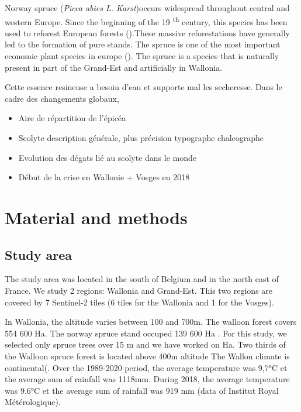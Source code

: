 \documentclass[3p,times]{elsarticle}
\begin{document}
Norway spruce (\textit{Picea abies L. Karst})occurs widespread throughout central and western Europe. Since the beginning of the 19 \textsuperscript{th} century, this species has been used to reforest European forests (\citep{3PresentDistributionofSecondaryNorwaySpruceinEurope}).These massive reforestations have generally led to the formation of pure stands. The spruce is one of the most important economic plant species in europe (\citep{nystedt_norway_2013}).
The spruce is a species that is naturally present in part of the Grand-Est  and artificially  in Wallonia. 

Cette essence resineuse a besoin d'eau et supporte mal les secheresse. Dans le cadre des changements globaux, 




\begin{itemize}
	\item Aire de répartition de l'épicéa
	\item Scolyte description générale, plus précision typographe chalcographe
	\item Evolution des dégats lié au scolyte dans le monde
	\item Début de la crise en Wallonie + Vosges en 2018
\end{itemize}

\section{Material and methods}
\subsection{Study area}
The study area was located in the south of Belgium and in the north east of France. We study 2 regions: Wallonia and Grand-Est.
This two regions are covered by 7 Sentinel-2 tiles (6 tiles for the Wallonia and 1 for the Vosges).

In Wallonia, the altitude varies between 100 and 700m. The walloon forest covers 554 600 Ha. The norway spruce stand occuped 139 600 Ha \citep{Alderweireld_2015}. For this study, we selected only spruce trees over 15 m and we have worked on %
Ha. Two thirds of the Walloon spruce forest is located above 400m altitude
The Wallon climate is continental(\citep{Metzger_2005}. %
Over the 1989-2020 period, the average temperature was 9,7°C et the average sum of rainfall was 1118mm. During 2018, the average temperature was 9.6°C et the average sum of rainfall was 919 mm (data of Institut Royal Métérologique). 
\end{document}
